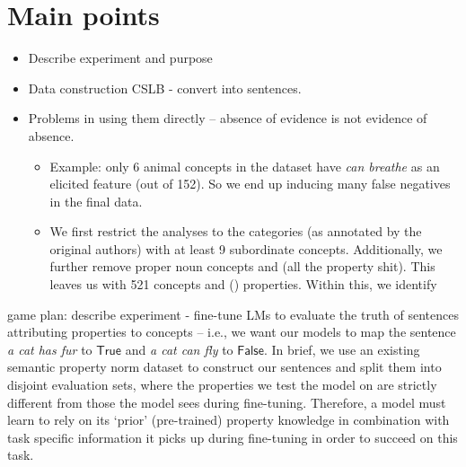 \documentclass[10pt,letterpaper]{article}
\newcommand{\true}{\mathsf{True}}
\newcommand{\false}{\mathsf{False}}
\begin{document}
\section{Main points}
\begin{itemize}
    \item Describe experiment and purpose
    \item Data construction CSLB - convert into sentences.
    \item Problems in using them directly -- absence of evidence is not evidence of absence.
    \begin{itemize}
        \item Example: only 6 animal concepts in the dataset have \textit{can breathe} as an elicited feature (out of 152). So we end up inducing many false negatives in the final data.
        \item We first restrict the analyses to the categories (as annotated by the original authors) with at least 9 subordinate concepts. Additionally, we further remove proper noun concepts and (all the property shit). This  leaves us with 521 concepts and () properties. Within this, we identify 
    \end{itemize}
\end{itemize}

game plan: describe experiment - fine-tune LMs to evaluate the truth of sentences attributing properties to concepts -- i.e., we want our models to map the sentence \textit{a cat has fur} to $\true$ and \textit{a cat can fly} to $\false$. In brief, we use an existing semantic property norm dataset to construct our sentences and split them into disjoint evaluation sets, where the properties we test the model on are strictly different from those the model sees during fine-tuning. Therefore, a model must learn to rely on its `prior' (pre-trained) property knowledge in combination with task specific information it picks up during fine-tuning in order to succeed on this task. 
\end{document}
